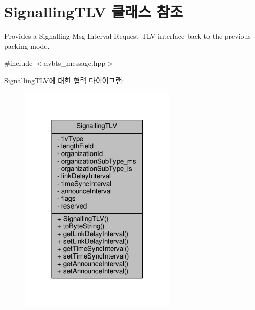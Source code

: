 \hypertarget{class_signalling_t_l_v}{}\section{Signalling\+T\+LV 클래스 참조}
\label{class_signalling_t_l_v}


Provides a Signalling Msg Interval Request T\+LV interface back to the previous packing mode.  




{\ttfamily \#include $<$avbts\+\_\+message.\+hpp$>$}



Signalling\+T\+L\+V에 대한 협력 다이어그램\+:
\nopagebreak
\begin{figure}[H]
\begin{center}
\leavevmode
\includegraphics[width=213pt]{class_signalling_t_l_v__coll__graph}
\end{center}
\end{figure}
